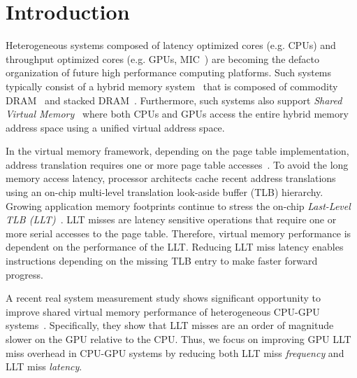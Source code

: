 
\section{Introduction}

\noindent Heterogeneous systems composed of latency optimized cores
(e.g. CPUs) and throughput optimized cores (e.g. GPUs, MIC~\cite{MIC})
are becoming the defacto organization of future high performance
computing platforms. Such systems typically consist of a hybrid memory
system~\cite{hbm_intel,hbm_amd,hbm_nvidia} that is composed of
commodity DRAM~\cite{ddr4-spec} and stacked
DRAM~\cite{hbm-spec,hmc_spec}. Furthermore, such systems also support
{\em Shared Virtual Memory}~\cite{HSA,UVM} where both CPUs and GPUs
access the entire hybrid memory address space using a unified virtual
address space.

In the virtual memory framework, depending on the page table
implementation, address translation requires one or more page table
accesses~\cite{Bhargava2008}. To avoid the long memory access latency,
processor architects cache recent address translations using an
on-chip multi-level translation look-aside buffer (TLB) hierarchy.
Growing application memory footprints continue to stress the on-chip 
{\em Last-Level TLB (LLT)}~\cite{spectlb, Basu2013, SharedLLT, COLT}. 
LLT misses are latency sensitive operations that require one or more 
serial accesses to the page table. Therefore, virtual memory 
performance is dependent on the performance of the LLT. Reducing LLT
miss latency enables instructions depending on the missing TLB entry
to make faster forward progress.

A recent real system measurement study shows significant opportunity
to improve shared virtual memory performance of heterogeneous CPU-GPU
systems~\cite{vesley2016ispass}. Specifically, they show that LLT
misses are an order of magnitude slower on the GPU relative to the
CPU. Thus, we focus on improving GPU LLT miss overhead in CPU-GPU
systems by reducing both LLT miss {\em frequency} and LLT miss {\em
latency}.



